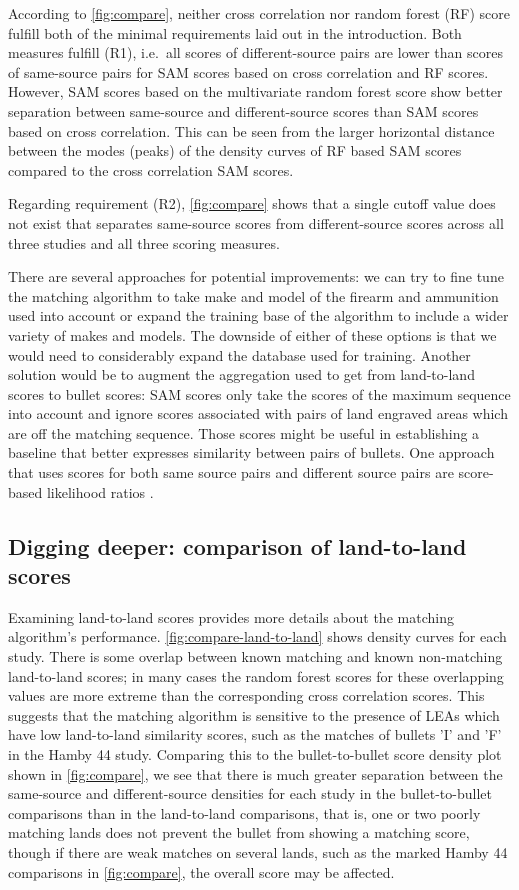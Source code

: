 \documentclass[doubleblind]{elsarticle}\usepackage[]{graphicx}\usepackage[]{color}
\begin{document}
According to \autoref{fig:compare}, neither cross correlation nor random forest (RF) score fulfill both of the minimal requirements laid out in the introduction. Both measures fulfill (R1), i.e.\ all  scores  of  different-source pairs are lower than scores of same-source pairs for SAM scores based on cross correlation and RF scores.
However, SAM scores based on the multivariate random forest score show better separation between same-source and different-source scores than SAM scores based on cross correlation. This can be seen from the larger horizontal distance between the modes (peaks) of the density curves of RF based SAM scores compared to the cross correlation SAM scores. 

Regarding requirement (R2), \autoref{fig:compare} shows that a single cutoff value does not exist that separates same-source scores from different-source scores across all three studies and all three scoring measures.

There are several approaches for potential improvements: we can try to fine tune the matching algorithm to take make and model of the firearm and ammunition used into account or expand the training base of the algorithm to include a wider variety of makes and models. The downside of either of these options is that we would need to considerably expand the database used for training. Another solution would be to augment the aggregation used to get from land-to-land scores to bullet scores: SAM scores only take the scores of the maximum sequence into account and ignore scores associated with pairs of land engraved areas which are off the matching sequence. Those scores might be useful in establishing a baseline that better expresses similarity between pairs of bullets. One approach that uses scores for both same source pairs and different source pairs are score-based likelihood ratios \citep{Bunch:2013if, Morrison:2018fh}.

\subsection{Digging deeper: comparison of land-to-land scores}

Examining land-to-land scores provides more details about the matching algorithm's performance. \autoref{fig:compare-land-to-land} shows density curves for each study. There is some overlap between known matching and known non-matching land-to-land scores; in many cases the random forest scores for these overlapping values are more extreme than the corresponding cross correlation scores. This suggests that the matching algorithm is sensitive to the presence of LEAs which have low land-to-land similarity scores, such as the matches of bullets 'I' and 'F' in the Hamby 44 study. Comparing this to the bullet-to-bullet score density plot shown in \autoref{fig:compare}, we see that there is much greater separation between the same-source and different-source densities for each study in the bullet-to-bullet comparisons than in the land-to-land comparisons, that is, one or two poorly matching lands does not prevent the bullet from showing a matching score, though if there are weak matches on several lands, such as the marked Hamby 44 comparisons in \autoref{fig:compare}, the overall score may be affected. 
\end{document}
